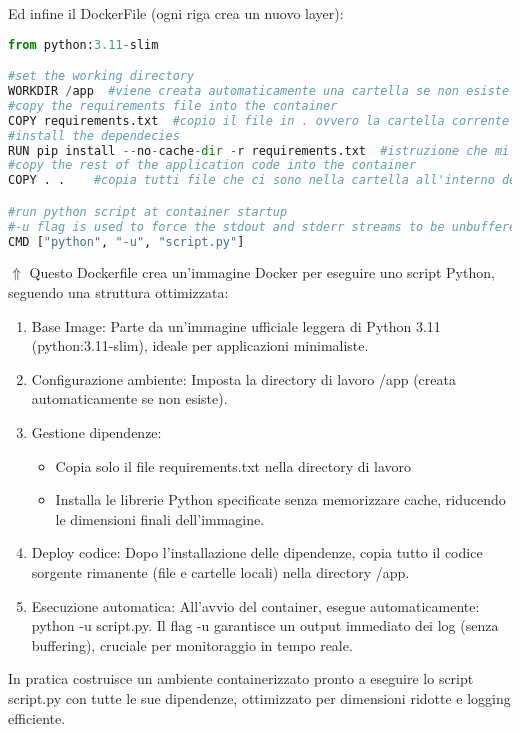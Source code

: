 \documentclass[a4paper,12pt]{article}
\begin{document}
Ed infine il DockerFile (ogni riga crea un nuovo layer): 
\begin{lstlisting}[language=Python, basicstyle=\ttfamily\footnotesize, breaklines=true, frame=single]
from python:3.11-slim

#set the working directory 
WORKDIR /app  #viene creata automaticamente una cartella se non esiste
#copy the requirements file into the container 
COPY requirements.txt  #copio il file in . ovvero la cartella corrente 
#install the dependecies
RUN pip install --no-cache-dir -r requirements.txt  #istruzione che mi permette di eseguire un comando come fosse una cmd nnormale
#copy the rest of the application code into the container 
COPY . .    #copia tutti file che ci sono nella cartella all'interno della cartella di destinazione

#run python script at container startup 
#-u flag is used to force the stdout and stderr streams to be unbuffered, wich can be useful for real-time logging 
CMD ["python", "-u", "script.py"]  
\end{lstlisting}
$\Uparrow$ Questo Dockerfile crea un'immagine Docker per eseguire uno script Python, seguendo una struttura ottimizzata:
\begin{enumerate}
    \item Base Image: Parte da un'immagine ufficiale leggera di Python 3.11 (python:3.11-slim), ideale per applicazioni minimaliste.
    \item Configurazione ambiente: Imposta la directory di lavoro /app (creata automaticamente se non esiste).
    \item Gestione dipendenze: 
    \begin{itemize}
        \item Copia solo il file requirements.txt nella directory di lavoro
        \item Installa le librerie Python specificate senza memorizzare cache, riducendo le dimensioni finali dell'immagine.
    \end{itemize}
    \item Deploy codice: Dopo l'installazione delle dipendenze, copia tutto il codice sorgente rimanente (file e cartelle locali) nella directory /app.
    \item Esecuzione automatica: All'avvio del container, esegue automaticamente: python -u script.py. Il flag -u garantisce un output immediato dei log (senza buffering), cruciale per monitoraggio in tempo reale.
\end{enumerate}
In pratica costruisce un ambiente containerizzato pronto a eseguire lo script script.py con tutte le sue dipendenze, ottimizzato per dimensioni ridotte e logging efficiente.
\end{document}
